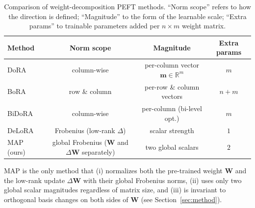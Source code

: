 \begin{table}[h]
\centering
\small
\setlength{\tabcolsep}{4pt}
\caption{Comparison of weight-decomposition PEFT methods. ``Norm scope'' refers to how the direction is defined; ``Magnitude'' to the form of the learnable scale; ``Extra params'' to trainable parameters added per $n\!\times\!m$ weight matrix.}
\begin{tabular}{l c c c}
\toprule
\textbf{Method} & \textbf{Norm scope} & \textbf{Magnitude} & \textbf{Extra params} \\
\midrule
DoRA  & column-wise & per-column vector $\mathbf{m}\in\mathbb{R}^m$ & $m$ \\
BoRA  & row \& column & per-row \& column vectors & $n+m$ \\
BiDoRA & column-wise & per-column (bi-level opt.) & $m$ \\
DeLoRA & Frobenius (low-rank $\Delta$) & scalar strength & $1$ \\
\rowcolor{gray!15}
MAP (ours) & global Frobenius ($\mathbf{W}$ and $\Delta\mathbf{W}$ separately) & two global scalars & $2$ \\
\bottomrule
\end{tabular}
\label{tab:decomp-comparison}
\end{table}

MAP is the only method that (i) normalizes both the pre-trained weight $\mathbf{W}$ and the low-rank update $\Delta\mathbf{W}$ with their global Frobenius norms, (ii) uses only two global scalar magnitudes regardless of matrix size, and (iii) is invariant to orthogonal basis changes on both sides of $\mathbf{W}$ (see Section~\ref{sec:method}).
